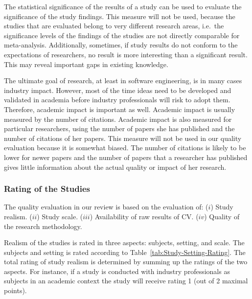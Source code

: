 The statistical significance of the results of a study can be used to evaluate the significance of the study findings.
This measure will not be used, because the studies that are evaluated belong to very different research areas, i.e.\ the significance levels of the findings of the studies are not directly comparable for meta-analysis.
Additionally, sometimes, if study results do not conform to the expectations of researchers, no result is more interesting than a significant result. This may reveal important gaps in existing knowledge.


The ultimate goal of research, at least in software engineering, is in many cases industry impact. However, most of the time ideas need to be developed and validated in academia before industry professionals will risk to adopt them. Therefore, academic impact is important as well. Academic impact is usually measured by the number of citations. Academic impact is also measured for particular researchers, using the number of papers she has published and the number of citations of her papers.
This measure will not be used in our quality evaluation because it is somewhat biased. The number of citations is likely to be lower for newer papers and the number of papers that a researcher has published gives little information about the actual quality or impact of her research.

\subsubsection{Rating of the Studies}
The quality evaluation in our review is based on the evaluation of: ($i$) Study realism. ($ii$) Study scale. ($iii$) Availability of raw results of CV. ($iv$) Quality of the research methodology.

Realism of the studies is rated in three aspects: subjects, setting, and scale.
The subjects and setting is rated according to Table~\ref{tab:Study-Setting-Rating}. The total rating of study realism is determined by summing up the ratings of the two aspects. For instance, if a study is conducted with industry professionals as subjects in an academic context the study will receive rating 1 (out of 2 maximal points). 

